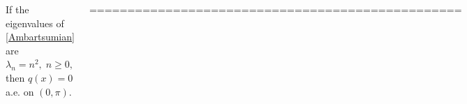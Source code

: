 \documentclass[a0paper,25pt]{tikzposter} %
\begin{document}
\begin{columns}
{
{If the eigenvalues of \eqref{Ambartsumian} are
$\lambda_n=n^2,\;n \ge 0,$ then $q(x)=0$ a.e. on $(0,\pi)$.}






=================================================

}
\end{columns}
\end{document}
